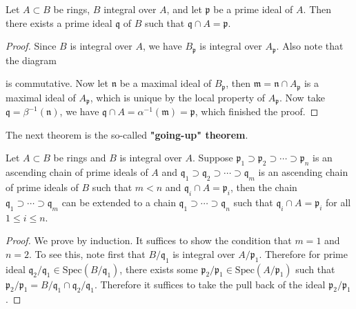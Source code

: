 \begin{theorem}
Let $A\subset B$ be rings, $B$ integral over $A$, and let $\mathfrak{p}$ be a prime ideal of $A$. Then there exists a prime ideal $\mathfrak{q}$ of $B$ such that $\mathfrak{q}\cap A=\mathfrak{p}$.
\end{theorem}
\begin{proof}
Since $B$ is integral over $A$, we have $B_\mathfrak{p}$ is integral over $A_\mathfrak{p}$. Also note that the diagram 
\begin{center}
\end{center}
is commutative. Now let $\mathfrak{n}$ be a maximal ideal of $B_\mathfrak{p}$, then $\mathfrak{m}=\mathfrak{n}\cap A_\mathfrak{p}$ is a maximal ideal of $A_\mathfrak{p}$, which is unique by the local property of $A_\mathfrak{p}$. Now take $\mathfrak{q}=\beta^{-1}(\mathfrak{n})$, we have $\mathfrak{q}\cap A=\alpha^{-1}(\mathfrak{m})=\mathfrak{p}$, which finished the proof.
\end{proof}
The next theorem is the so-called \textbf{"going-up" theorem}.
\begin{theorem}
Let $A\subset B$ be rings and $B$ is integral over $A$. Suppose $\mathfrak{p}_1\supset\mathfrak{p}_2\supset\cdots\supset\mathfrak{p}_n$ is an ascending chain of prime ideals of $A$ and $\mathfrak{q}_1\supset\mathfrak{q}_2\supset\cdots\supset\mathfrak{q}_m$ is an ascending chain of prime ideals of $B$ such that $m<n$ and $\mathfrak{q}_i\cap A=\mathfrak{p}_i$, then the chain $\mathfrak{q}_1\supset\cdots\supset\mathfrak{q}_m$ can be extended to a chain $\mathfrak{q}_1\supset\cdots\supset\mathfrak{q}_n$ such that $\mathfrak{q}_i\cap A=\mathfrak{p}_i$ for all $1\le i\le n$.
\end{theorem}
\begin{proof}
We prove by induction. It suffices to show the condition that $m=1$ and $n=2$. To see this, note first that $B/\mathfrak{q}_1$ is integral over $A/\mathfrak{p}_1$. Therefore for prime ideal $\mathfrak{q}_2/\mathfrak{q}_1\in\mathrm{Spec}(B/\mathfrak{q}_1)$, there exists some $\mathfrak{p}_2/\mathfrak{p}_1\in\mathrm{Spec}(A/\mathfrak{p}_1)$ such that $\mathfrak{p}_2/\mathfrak{p}_1=B/\mathfrak{q}_1\cap\mathfrak{q}_2/\mathfrak{q}_1$. Therefore it suffices to take the pull back of the ideal $\mathfrak{p}_2/\mathfrak{p}_1$.
\end{proof}
